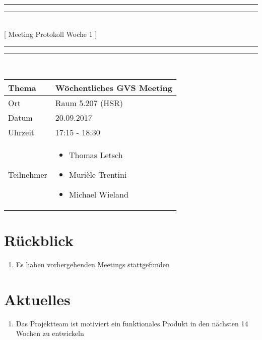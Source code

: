 \documentclass[11pt, a4paper,oneside]{scrartcl}
\begin{document}
\centering
\rule{\textwidth}{1.6pt}\vspace*{-\baselineskip}\vspace*{2pt} %
\rule{\textwidth}{0.4pt}\\[\baselineskip] %
{\LARGE [ Meeting Protokoll Woche 1 ]}\\[0.2\baselineskip] %
\rule{\textwidth}{0.4pt}\vspace*{-\baselineskip}\vspace{3.2pt} %
\rule{\textwidth}{1.6pt}\\[2\baselineskip] %

\begin{tabu} to \linewidth {l X }
	\toprule
	\textbf{Thema} & \textbf{Wöchentliches GVS Meeting} \\
	\midrule
	Ort & Raum 5.207 (HSR) \\
	Datum & 20.09.2017 \\
	Uhrzeit & 17:15 - 18:30 \\
	Teilnehmer & 
	\begin{minipage}[t]{\textwidth}
	  	\begin{itemize}
	  		\item Thomas Letsch
			\item Murièle Trentini
			\item Michael Wieland
	  	\end{itemize}
	\end{minipage}
	\\
	\bottomrule
\end{tabu}


\section{Rückblick}
\begin{enumerate}
	\item Es haben vorhergehenden Meetings stattgefunden
\end{enumerate}

\section{Aktuelles}
\begin{enumerate}
	\item Das Projektteam ist motiviert ein funktionales Produkt in den nächsten 14 Wochen zu entwickeln
\end{enumerate}
\end{document}
